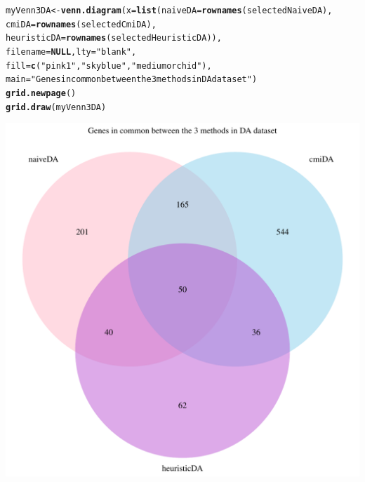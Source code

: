 \documentclass[a4paper,10pt]{article}\usepackage[]{graphicx}\usepackage[]{color}
\makeatletter
\def\maxwidth{ %
  \ifdim\Gin@nat@width>\linewidth
    \linewidth
  \else
    \Gin@nat@width
  \fi
}
\newcommand{\hlstr}[1]{\textcolor[rgb]{0.192,0.494,0.8}{#1}}%
\newcommand{\hlstd}[1]{\textcolor[rgb]{0.345,0.345,0.345}{#1}}%
\newcommand{\hlkwa}[1]{\textcolor[rgb]{0.161,0.373,0.58}{\textbf{#1}}}%
\newcommand{\hlkwb}[1]{\textcolor[rgb]{0.69,0.353,0.396}{#1}}%
\newcommand{\hlkwc}[1]{\textcolor[rgb]{0.333,0.667,0.333}{#1}}%
\newcommand{\hlkwd}[1]{\textcolor[rgb]{0.737,0.353,0.396}{\textbf{#1}}}%
\newenvironment{kframe}{%
 \def\at@end@of@kframe{}%
 \ifinner\ifhmode%
  \def\at@end@of@kframe{\end{minipage}}%
  \begin{minipage}{\columnwidth}%
 \fi\fi%
 \def\FrameCommand##1{\hskip\@totalleftmargin \hskip-\fboxsep
 \colorbox{shadecolor}{##1}\hskip-\fboxsep
     \hskip-\linewidth \hskip-\@totalleftmargin \hskip\columnwidth}%
 \MakeFramed {\advance\hsize-\width
   \@totalleftmargin\z@ \linewidth\hsize
   \@setminipage}}%
 {\par\unskip\endMakeFramed%
 \at@end@of@kframe}
\newenvironment{knitrout}{}{} %
\makeatother
\begin{document}
\begin{knitrout}
\color{fgcolor}\begin{kframe}
\begin{alltt}
\hlstd{myVenn3DA}\hlkwb{<-} \hlkwd{venn.diagram}\hlstd{(}\hlkwc{x}\hlstd{=}\hlkwd{list}\hlstd{(}\hlkwc{naiveDA}\hlstd{=}\hlkwd{rownames}\hlstd{(selectedNaiveDA),}
                                \hlkwc{cmiDA}\hlstd{=}\hlkwd{rownames}\hlstd{(selectedCmiDA),}
                                \hlkwc{heuristicDA} \hlstd{=} \hlkwd{rownames}\hlstd{(selectedHeuristicDA)),}
                                \hlkwc{filename}\hlstd{=}\hlkwa{NULL}\hlstd{,} \hlkwc{lty} \hlstd{=} \hlstr{"blank"}\hlstd{,}
                                \hlkwc{fill}\hlstd{=}\hlkwd{c}\hlstd{(}\hlstr{"pink1"}\hlstd{,} \hlstr{"skyblue"}\hlstd{,} \hlstr{"mediumorchid"}\hlstd{),}
                       \hlkwc{main}\hlstd{=}\hlstr{"Genes in common between the 3 methods in DA dataset"}\hlstd{)}
\hlkwd{grid.newpage}\hlstd{()}
\hlkwd{grid.draw}\hlstd{(myVenn3DA)}
\end{alltt}
\end{kframe}
\includegraphics[width=\maxwidth]{figure/compare3DA-1} 

\end{knitrout}
\end{document}
